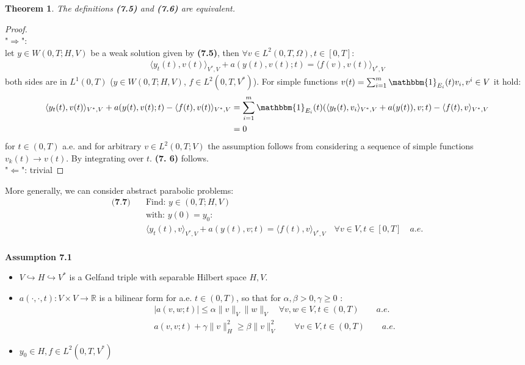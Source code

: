 \documentclass[a4paper,11pt,fleqn]{book}
\newtheorem{theorem}{Theorem}[section]
\theoremstyle{definition}
\theoremstyle{remark}
\begin{document}
\begin{theorem}
	The definitions \textbf{(7.5)} and \textbf{(7.6)} are equivalent. 
\end{theorem}
\begin{proof}\quad\\
"$\Rightarrow$": \quad\\
	let $y \in W(0, T; H, V)$ be a weak solution given by \textbf{(7.5)}, then  $\forall v \in L^2(0, T, \Omega), t \in [0, T]$:
	\begin{align*}
		\langle y_t(t), v(t) \rangle_{V^*, V} + a(y(t), v(t); t) =\langle f(v), v(t) \rangle_{V^*, V}
	\end{align*} 
	both sides are in $L^1(0, T)$ ($y \in W(0, T;H, V)$, $f \in L^2(0, T, V^*)$). For simple functions $v(t) = \sum_{i = 1}^m \mathbbm{1}_{E_i}(t) v_i, v^i \in V$ it hold:
	\begin{align*}
		\langle y_t(t), v(t) \rangle_{V^*, V} + a(y(t), v(t); t) - \langle f(t), v(t) \rangle_{V^*, V} &= 
		\sum_{i = 1}^m \mathbbm{1}_{E_i}(t) (\langle y_t(t), v_i \rangle_{V^*, V} + a(y(t)), v; t) - \langle f(t), v \rangle_{V^*, V}\\
		 &= 0
	\end{align*}
	for $t \in (0, T)$ a.e. and for arbitrary $v \in L^2(0, T; V)$ the assumption follows from considering a sequence of simple functions $v_k(t) \rightarrow v(t)$. By integrating over $t$. \textbf{(7. 6)} follows. \\
	"$\Leftarrow$": trivial
\end{proof}

More generally, we can consider abstract parabolic problems: 
\begin{align*}\textbf{(7.7)} \quad
	&\text{Find: } y \in (0, T; H, V)\\
	&\text{with: } y(0) = y_0: \\
	&\langle y_t(t), v \rangle_{V^*,  V} + a(y(t), v; t) = \langle f(t), v \rangle_{V^*, V} \quad \forall v \in V, t \in [0, T] \quad a.e.
\end{align*}
\quad\\
\textbf{Assumption 7.1}
\begin{itemize}
	\item $V \hookrightarrow H \hookrightarrow V^*$ is a Gelfand triple with separable Hilbert space $H, V$. 
	\item $a(\cdot, \cdot, t): V \times V \rightarrow \mathbb{R}$ is a bilinear form for a.e. $t \in (0, T)$, so that for $\alpha, \beta > 0, \gamma \geq 0$ :
	\begin{align*}
		|a(v, w;t)| \le \alpha \|v\|_V \|w\|_V \quad \forall v, w \in V, t \in (0, T) \qquad a.e.\\
		a(v, v;t) + \gamma \|v\|_H^2 \geq \beta \|v\|_V^2 \qquad \forall v \in V, t \in (0, T) \qquad a.e.
	\end{align*}
	\item $y_0 \in H, f \in L^2(0, T, V^*)$
\end{itemize}
\end{document}
